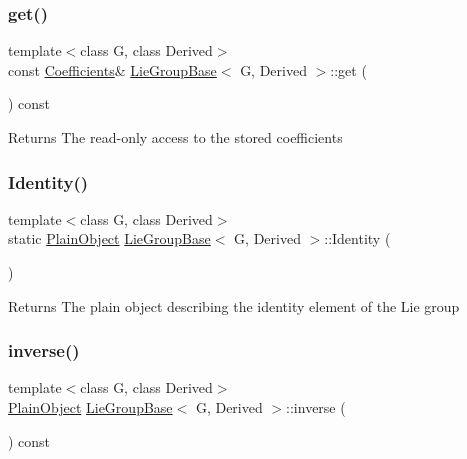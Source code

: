 \subsubsection{\texorpdfstring{get()}{get()}\hspace{0.1cm}{\footnotesize\ttfamily [2/2]}}
{\footnotesize\ttfamily template$<$class G, class Derived$>$ \\
const \hyperlink{class_lie_group_base_abb840873afd0a4f54f9ad4265e1d0095}{Coefficients}\& \hyperlink{class_lie_group_base}{Lie\+Group\+Base}$<$ G, Derived $>$\+::get (\begin{DoxyParamCaption}{ }\end{DoxyParamCaption}) const\hspace{0.3cm}{\ttfamily [inline]}}

\begin{DoxyReturn}{Returns}
The read-\/only access to the stored coefficients 
\end{DoxyReturn}
\hypertarget{class_lie_group_base_a3a034860d2bfef95e9a1be039ae819ae}{}\label{class_lie_group_base_a3a034860d2bfef95e9a1be039ae819ae} 
\subsubsection{\texorpdfstring{Identity()}{Identity()}}
{\footnotesize\ttfamily template$<$class G, class Derived$>$ \\
static \hyperlink{class_lie_group_base_a37b1d64048a2fa65b298801f6028c468}{Plain\+Object} \hyperlink{class_lie_group_base}{Lie\+Group\+Base}$<$ G, Derived $>$\+::Identity (\begin{DoxyParamCaption}{ }\end{DoxyParamCaption})\hspace{0.3cm}{\ttfamily [static]}}

\begin{DoxyReturn}{Returns}
The plain object describing the identity element of the Lie group 
\end{DoxyReturn}
\hypertarget{class_lie_group_base_a7654738542ae367b4cc61a0e87ad3f03}{}\label{class_lie_group_base_a7654738542ae367b4cc61a0e87ad3f03} 
\subsubsection{\texorpdfstring{inverse()}{inverse()}}
{\footnotesize\ttfamily template$<$class G, class Derived$>$ \\
\hyperlink{class_lie_group_base_a37b1d64048a2fa65b298801f6028c468}{Plain\+Object} \hyperlink{class_lie_group_base}{Lie\+Group\+Base}$<$ G, Derived $>$\+::inverse (\begin{DoxyParamCaption}{ }\end{DoxyParamCaption}) const}

